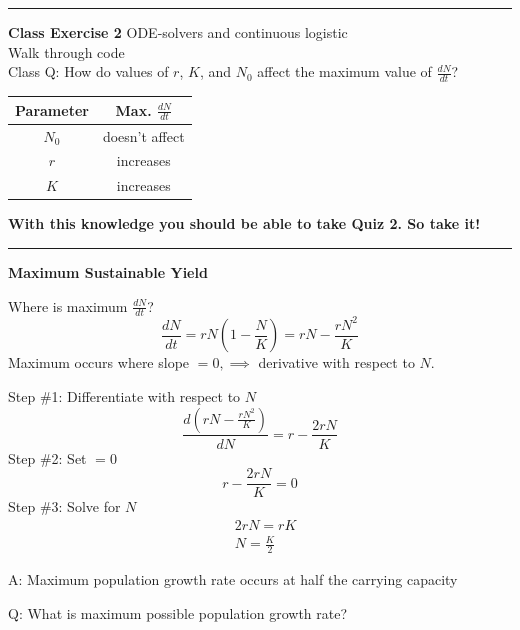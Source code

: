 \documentclass{article}
\newcommand{\note}[1]{\colorbox{gray!30}{#1}}
\begin{document}
\rule[0.5ex]{\linewidth}{1pt}

\textbf{Class Exercise 2} ODE-solvers and continuous logistic\\
\note{Walk through code}\\
\note{Class Q:} How do values of $r$, $K$, and $N_0$ affect the maximum value of $\frac{dN}{dt}$?

\begin{table}[h]
\centering
\begin{tabular}{|c|c|}
\hline
 \textbf{Parameter} & \textbf{Max. $\tfrac{dN}{dt}$} \\ 
 \hline
$N_0$ & doesn't affect \\ 
$r$ & increases \\ 
$K$ &  increases \\ 
\hline
\end{tabular} 
\end{table}

\begin{center}
	\textbf{With this knowledge you should be able to take Quiz 2.  So take it!}
\end{center}

\rule[0.5ex]{\linewidth}{1pt}

\pagebreak

\textbf{Maximum Sustainable Yield}

Where is maximum $\frac{dN}{dt}$?
\begin{equation*}
	\frac{dN}{dt}=rN\left(1-\frac{N}{K}\right)=rN-\frac{rN^2}{K}
\end{equation*}
Maximum occurs where slope $=0, \implies$ derivative with respect to $N$.

Step \#1:  Differentiate with respect to $N$
\begin{equation*}
	\frac{d\left(rN-\tfrac{rN^2}{K}\right)}{dN}=r-\frac{2rN}{K}
\end{equation*}
Step \#2: Set $=0$
\begin{equation*}
	r-\frac{2rN}{K}=0
\end{equation*}
Step \#3: Solve for $N$
\begin{align*}
&	2rN=rK\\
&	N=\frac{K}{2}
\end{align*}
\begin{center}
	\note{A:} Maximum population growth rate occurs at half the carrying capacity
\end{center}

\note{Q:} What is maximum possible population growth rate?
\end{document}
